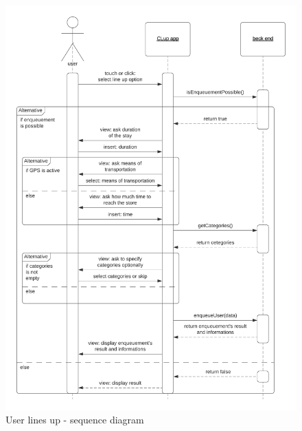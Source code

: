 \begin{figure}[h!]
    \centering
    \includegraphics[width=\textwidth]{Images/sequencediagrams/UserlinesupSD.png}
    \caption{\label{fig:userlinesup}User lines up - sequence diagram}
\end{figure}

